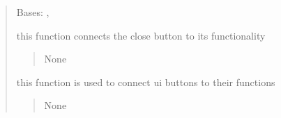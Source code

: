 \documentclass[letterpaper,10pt,english]{sphinxmanual}
\begin{document}
\begin{quote}
\begin{savenotes}\begin{fulllineitems}
\label{\detokenize{setting/notif_UI:oxin.notif_UI.UI_main_window}}
\pysigstartsignatures
{}
\pysigstopsignatures
\sphinxAtStartPar
Bases: , 

\begin{savenotes}\begin{fulllineitems}
\label{\detokenize{setting/notif_UI:oxin.notif_UI.UI_main_window.activate_}}
\pysigstartsignatures
{}
\pysigstopsignatures
\sphinxAtStartPar
this function connects the close button to its functionality
\begin{quote}\begin{description}
\sphinxAtStartPar
None

\end{description}\end{quote}

\end{fulllineitems}\end{savenotes}


\begin{savenotes}\begin{fulllineitems}
\label{\detokenize{setting/notif_UI:oxin.notif_UI.UI_main_window.buttonClick}}
\pysigstartsignatures
{}
\pysigstopsignatures
\sphinxAtStartPar
this function is used to connect ui buttons to their functions
\begin{quote}\begin{description}
\sphinxAtStartPar
None

\end{description}\end{quote}


\end{fulllineitems}
\end{savenotes}
\end{fulllineitems}
\end{savenotes}
\end{quote}
\end{document}
